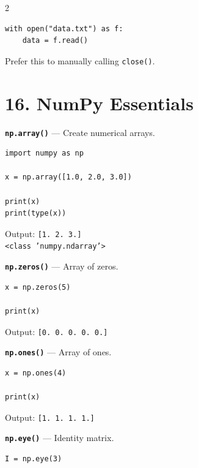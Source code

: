 \documentclass[10pt,a4paper]{article}
\begin{document}
\begin{multicols}{2}
\begin{card}
\begin{lstlisting}[style=pythonstyle]
with open("data.txt") as f:
    data = f.read()
\end{lstlisting}

Prefer this to manually calling \texttt{close()}.
\end{card}

\section*{16. NumPy Essentials}

\begin{card}
\textbf{\texttt{np.array()}} --- Create numerical arrays.

\begin{lstlisting}[style=pythonstyle]
import numpy as np

x = np.array([1.0, 2.0, 3.0])

print(x)
print(type(x))
\end{lstlisting}

Output:
\texttt{[1. 2. 3.]}\\
\texttt{<class 'numpy.ndarray'>}
\end{card}

\begin{card}
\textbf{\texttt{np.zeros()}} --- Array of zeros.

\begin{lstlisting}[style=pythonstyle]
x = np.zeros(5)

print(x)
\end{lstlisting}

Output:
\texttt{[0. 0. 0. 0. 0.]}
\end{card}

\begin{card}
\textbf{\texttt{np.ones()}} --- Array of ones.

\begin{lstlisting}[style=pythonstyle]
x = np.ones(4)

print(x)
\end{lstlisting}

Output:
\texttt{[1. 1. 1. 1.]}
\end{card}

\begin{card}
\textbf{\texttt{np.eye()}} --- Identity matrix.

\begin{lstlisting}[style=pythonstyle]
I = np.eye(3)


\end{lstlisting}
\end{card}
\end{multicols}
\end{document}
